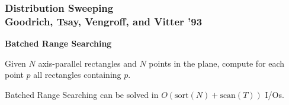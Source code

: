 \documentclass[english, aspectratio=169]{beamer}
\newcommand{\scan}[0]{\text{scan}}
\newcommand{\sort}[0]{\text{sort}}
\begin{document}
\begin{frame}
  \frametitle{Distribution Sweeping\\Goodrich, Tsay, Vengroff, and Vitter '93}

  \textbf{Batched Range Searching}

  Given $N$ axis-parallel rectangles and $N$ points in the plane, compute for
  each point $p$ all rectangles containing $p$.

  \begin{figure}
    \centering
    \begin{tikzpicture}
      
    \end{tikzpicture}
  \end{figure}

  \begin{theorem}
    Batched Range Searching can be solved in $O(\sort(N) + \scan(T))$ I/Os.
  \end{theorem}
\end{frame}
\end{document}
